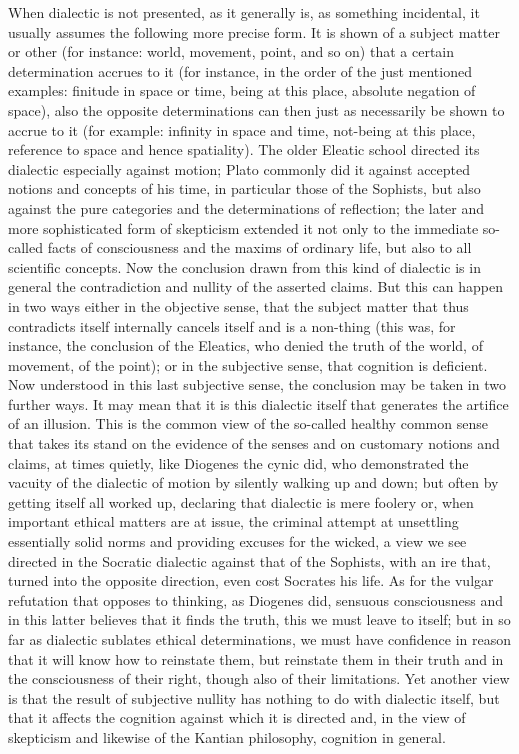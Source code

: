 When dialectic is not presented, as it generally is,
as something incidental, it usually assumes
the following more precise form.
It is shown of a subject matter or other
(for instance: world, movement, point, and so on)
that a certain determination accrues to it
(for instance, in the order of the just mentioned examples:
finitude in space or time, being at this place,
absolute negation of space),
also the opposite determinations can then
just as necessarily be shown to accrue to it
(for example: infinity in space and time,
not-being at this place,
reference to space and hence spatiality).
The older Eleatic school directed
its dialectic especially against motion;
Plato commonly did it against accepted
notions and concepts of his time,
in particular those of the Sophists,
but also against the pure categories
and the determinations of reflection;
the later and more sophisticated form of skepticism
extended it not only to the immediate so-called facts of consciousness
and the maxims of ordinary life,
but also to all scientific concepts.
Now the conclusion drawn from this kind of dialectic is
in general the contradiction and nullity of the asserted claims.
But this can happen in two ways either in the objective sense,
that the subject matter that thus contradicts itself
internally cancels itself and is a non-thing
(this was, for instance, the conclusion of the Eleatics,
who denied the truth of the world, of movement, of the point);
or in the subjective sense, that cognition is deficient.
Now understood in this last subjective sense,
the conclusion may be taken in two further ways.
It may mean that it is this dialectic itself
that generates the artifice of an illusion.
This is the common view of the so-called
healthy common sense that takes its stand
on the evidence of the senses
and on customary notions and claims,
at times quietly, like Diogenes the cynic did,
who demonstrated the vacuity of the dialectic of motion
by silently walking up and down;
but often by getting itself all worked up,
declaring that dialectic is mere foolery or,
when important ethical matters are at issue,
the criminal attempt at unsettling essentially solid norms
and providing excuses for the wicked,
a view we see directed in the Socratic dialectic
against that of the Sophists, with an ire that,
turned into the opposite direction,
even cost Socrates his life.
As for the vulgar refutation that opposes to thinking,
as Diogenes did, sensuous consciousness
and in this latter believes that it finds the truth,
this we must leave to itself;
but in so far as dialectic sublates ethical determinations,
we must have confidence in reason that it will
know how to reinstate them,
but reinstate them in their truth
and in the consciousness of their right,
though also of their limitations.
Yet another view is that the
result of subjective nullity has
nothing to do with dialectic itself,
but that it affects the cognition
against which it is directed
and, in the view of skepticism
and likewise of the Kantian philosophy,
cognition in general.


